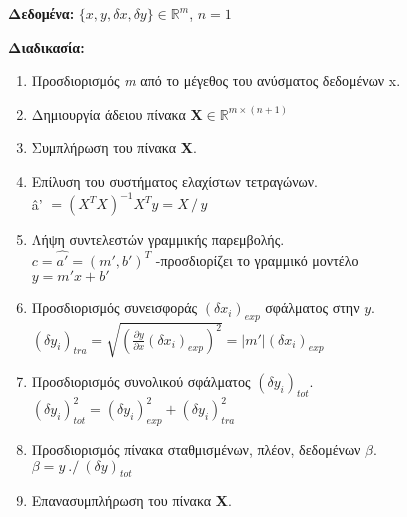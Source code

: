 \begin{refsection}
\begin{tcolorbox}[breakable, fonttitle=\bfseries, title=Αλγόριθμος 1: Γραμμική μοντελοποίηση]

\large \textbf{Δεδομένα:} $\{x, y, \delta x, \delta y\} \in \mathbb{R}^m$, $n = 1$

\large \textbf{Διαδικασία:}
\begin{enumerate}
\item Προσδιορισμός \textit{m} από το μέγεθος του ανύσματος δεδομένων x.
\item Δημιουργία άδειου πίνακα \textbf{X}$\in\mathbb{R}^{m \times (n+1)} $
\item Συμπλήρωση του πίνακα \textbf{X}.

\IncMargin{3em}
\begin{algorithm}[H]


\end{algorithm}\DecMargin{3em}

\item Επίλυση του συστήματος ελαχίστων τετραγώνων.\\
 \^{a'} $= ( X^T X )^{-1} X^T y = Χ \, / \, y$

\item Λήψη συντελεστών γραμμικής παρεμβολής.\\ $ c = \hat{a'} = (m', b')^T $ \hfill -προσδιορίζει το γραμμικό μοντέλο\\ \phantom{a} \hfill  $y = m'x + b'$

\item Προσδιορισμός συνεισφοράς $(\delta x_i)_{exp}$ σφάλματος στην $y$.\\ $(\delta y_i)_{tra} = \sqrt{\left(\displaystyle\frac{\partial y}{\partial x} (\delta x_i)_{exp}\right)^2 } = |m'|(\delta x_i)_{exp}$
\item Προσδιορισμός συνολικού σφάλματος $(\delta y_i)_{tot}$.\\ $(\delta y_i)_{tot}^2 = (\delta y_i)_{exp}^2 + (\delta y_i)_{tra}^2$ 
\item Προσδιορισμός πίνακα σταθμισμένων, πλέον, δεδομένων $\beta$.\\$\beta = y \: ./ \: (\delta y)_{tot}$
\item Επανασυμπλήρωση του πίνακα \textbf{X}.

\IncMargin{3em}
\begin{algorithm}[H]


\end{algorithm}
\end{enumerate}
\end{tcolorbox}
\end{refsection}
